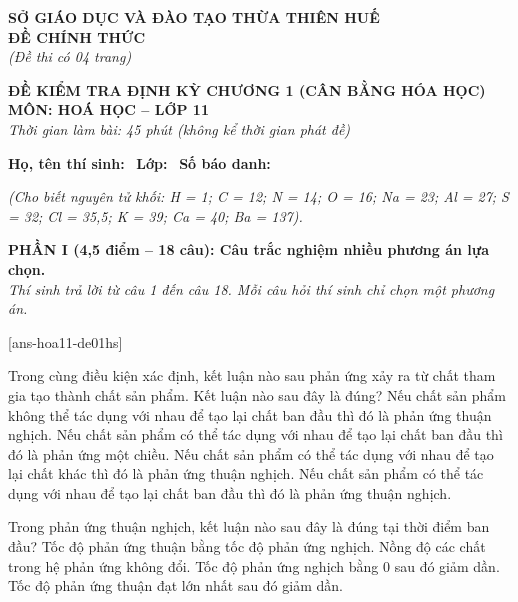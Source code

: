 \documentclass[12pt,a4paper]{article}
\begin{document}
\thispagestyle{firstpage}

\noindent
\begin{minipage}[t]{0.44\textwidth}
	\centering\fontsize{10pt}{12pt}\selectfont
	\textbf{SỞ GIÁO DỤC VÀ ĐÀO TẠO THỪA THIÊN HUẾ}\\
	\textbf{ĐỀ CHÍNH THỨC}\\
	\textit{(Đề thi có 04 trang)}
\end{minipage}\hfill
\begin{minipage}[t]{0.54\textwidth}
	\centering\small
	\textbf{ĐỀ KIỂM TRA ĐỊNH KỲ CHƯƠNG 1 (CÂN BẰNG HÓA HỌC)}\\
	\textbf{MÔN: HOÁ HỌC -- LỚP 11}\\
	\textit{Thời gian làm bài: 45 phút (không kể thời gian phát đề)}\\
\end{minipage}

\smallskip
\noindent\hrulefill
\smallskip

\noindent\textbf{Họ, tên thí sinh:} \dotfill\ \textbf{Lớp:} \dotfill\ \textbf{Số báo danh:} \dotfill

\smallskip
\noindent\textit{(Cho biết nguyên tử khối: H = 1; C = 12; N = 14; O = 16; Na = 23; Al = 27; S = 32; Cl = 35,5; K = 39; Ca = 40; Ba = 137).}
\smallskip

\noindent
\textbf{PHẦN I (4,5 điểm -- 18 câu): Câu trắc nghiệm nhiều phương án lựa chọn.}\\
\textit{Thí sinh trả lời từ câu 1 đến câu 18. Mỗi câu hỏi thí sinh chỉ chọn một phương án.}

[ans-hoa11-de01hs]

\begin{ex}
Trong cùng điều kiện xác định, kết luận nào sau phản ứng xảy ra từ chất tham gia tạo thành chất sản phẩm. Kết luận nào sau đây là đúng?
\choice
{Nếu chất sản phẩm không thể tác dụng với nhau để tạo lại chất ban đầu thì đó là phản ứng thuận nghịch.}
{Nếu chất sản phẩm có thể tác dụng với nhau để tạo lại chất ban đầu thì đó là phản ứng một chiều.}
{Nếu chất sản phẩm có thể tác dụng với nhau để tạo lại chất khác thì đó là phản ứng thuận nghịch.}
{Nếu chất sản phẩm có thể tác dụng với nhau để tạo lại chất ban đầu thì đó là phản ứng thuận nghịch.}
\loigiai{}
\end{ex}

\begin{ex}
Trong phản ứng thuận nghịch, kết luận nào sau đây là đúng tại thời điểm ban đầu?
\choice
{Tốc độ phản ứng thuận bằng tốc độ phản ứng nghịch.}
{Nồng độ các chất trong hệ phản ứng không đổi.}
{Tốc độ phản ứng nghịch bằng 0 sau đó giảm dần.}
{Tốc độ phản ứng thuận đạt lớn nhất sau đó giảm dần.}
\loigiai{}
\end{ex}
\end{document}
